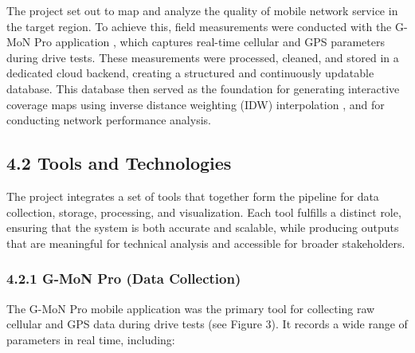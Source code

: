 \documentclass[11pt]{article}
\begin{document}
The project set out to map and analyze the quality of mobile network
service in the target region. To achieve this, field measurements were
conducted with the G-MoN Pro application \cite{gmon2023}, which
captures real-time cellular and GPS parameters during drive tests. These
measurements were processed, cleaned, and stored in a dedicated cloud
backend, creating a structured and continuously updatable database. This
database then served as the foundation for generating interactive
coverage maps using inverse distance weighting (IDW) interpolation
\cite{shepard1968}, and for conducting network performance analysis.

\hypertarget{tools-and-technologies}{%
\subsection{4.2 Tools and Technologies}\label{tools-and-technologies}}

The project integrates a set of tools that together form the pipeline
for data collection, storage, processing, and visualization. Each tool
fulfills a distinct role, ensuring that the system is both accurate and
scalable, while producing outputs that are meaningful for technical
analysis and accessible for broader stakeholders.

\hypertarget{g-mon-pro-data-collection}{%
\subsubsection{4.2.1 G-MoN Pro (Data
Collection)}\label{g-mon-pro-data-collection}}

The G-MoN Pro mobile application\cite{gmon2023} was the primary tool for collecting raw
cellular and GPS data during drive tests (see Figure 3). It records a wide range of
parameters in real time, including:
\end{document}
